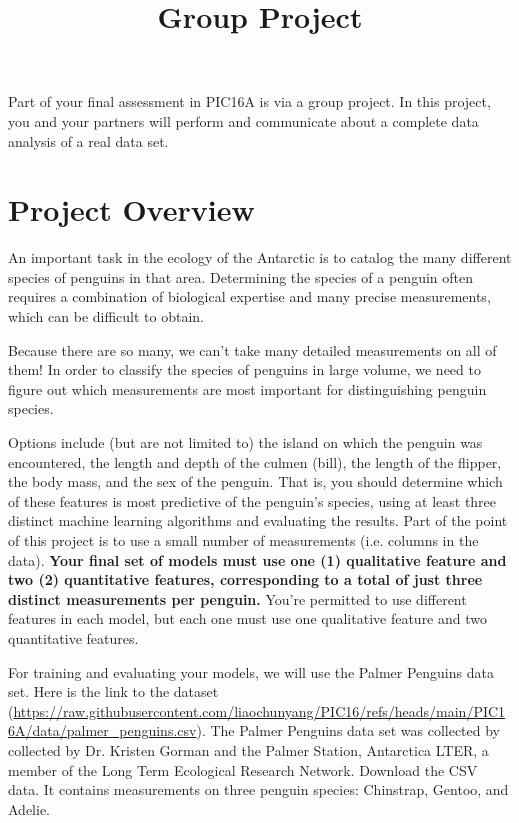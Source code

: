 \documentclass[12pt]{article}
\title{Group Project}
\date{}
\begin{document}
\maketitle
Part of your final assessment in PIC16A is via a group project. In this project, you and your partners will perform and communicate about a complete data analysis of a real data set.

\section{Project Overview}
An important task in the ecology of the Antarctic is to catalog the many different species of penguins in that area. Determining the species of a penguin often requires a combination of biological expertise and many precise measurements, which can be difficult to obtain.

\noindent Because there are so many, we can’t take many detailed measurements on all of them! In order to classify the species of penguins in large volume, we need to figure out which measurements are most important for distinguishing penguin species.

 Options include (but are not limited to) the island on which the penguin was encountered, the length and depth of the culmen (bill), the length of the flipper, the body mass, and the sex of the penguin. That is, you should determine which of these features is most predictive of the penguin’s species, using at least three distinct machine learning algorithms and evaluating the results.
Part of the point of this project is to use a small number of measurements (i.e. columns in the data). {\bf Your final set of models must use one (1) qualitative feature and two (2) quantitative features, corresponding to a total of just three distinct measurements per penguin.} You’re permitted to use different features in each model, but each one must use one qualitative feature and two quantitative features.

\noindent For training and evaluating your models, we will use the Palmer Penguins data set. Here is the link to the dataset (\url{https://raw.githubusercontent.com/liaochunyang/PIC16/refs/heads/main/PIC16A/data/palmer_penguins.csv}). 
The Palmer Penguins data set was collected by collected by Dr. Kristen Gorman and the Palmer Station, Antarctica LTER, a member of the Long Term Ecological Research Network. Download the CSV data. It contains measurements on three penguin species: Chinstrap, Gentoo, and Adelie.
\end{document}
